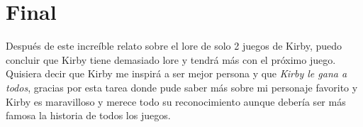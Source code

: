 \documentclass{article}
\begin{document}
\section{Final}
Después de este increíble relato sobre el lore de solo 2 juegos de Kirby, puedo concluir que Kirby tiene demasiado lore y tendrá más con el próximo juego. \\
Quisiera decir que Kirby me inspirá a ser mejor persona y que \textit{Kirby le gana a todos}, gracias por esta tarea donde pude saber más sobre mi personaje favorito y Kirby es maravilloso y merece todo su reconocimiento aunque debería ser más famosa la historia de todos los juegos. 
\end{document}
